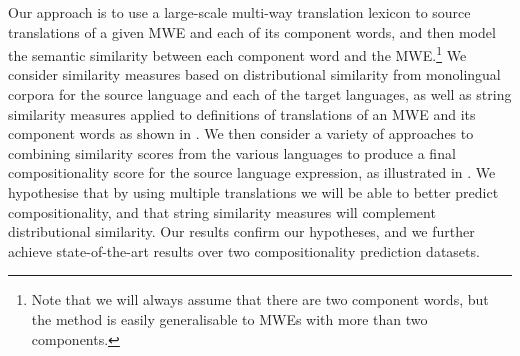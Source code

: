 \documentclass[output=paper
,modfonts
,nonflat]{langsci/langscibook}
\begin{document}
Our approach is to use a large-scale multi-way translation lexicon to
source translations of a given MWE and each of its component words,
and then model the semantic similarity between each component word and
the MWE.\footnote{Note that we will always assume that there are two
  component words, but the method is easily generalisable to MWEs with
  more than two components.} We consider similarity measures based on
distributional similarity from monolingual corpora for the source
language and each of the target languages, as well as string
similarity measures applied to definitions of translations of an MWE
and its component words as shown in . We then
consider a variety of approaches to combining similarity scores from
the various languages to produce a final compositionality score for
the source language expression, as illustrated in
. We hypothesise that by using multiple
translations we will be able to better predict compositionality, and
that string similarity measures will complement distributional
similarity.  Our results confirm our hypotheses, and we further
achieve state-of-the-art results over two compositionality prediction
datasets.
\end{document}
